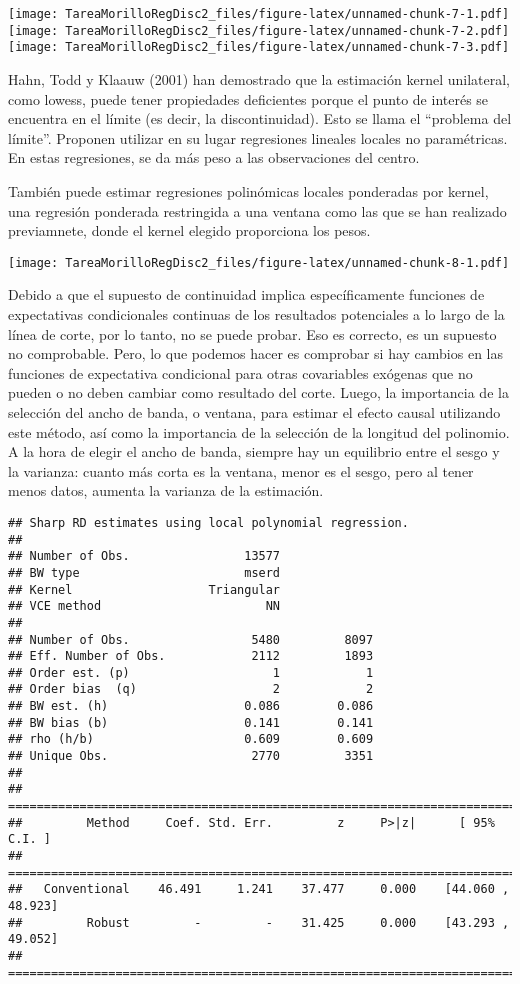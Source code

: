 \documentclass[
]{article}
\begin{document}
\texttt{[image: TareaMorilloRegDisc2\_files/figure-latex/unnamed-chunk-7-1.pdf]}
\texttt{[image: TareaMorilloRegDisc2\_files/figure-latex/unnamed-chunk-7-2.pdf]}
\texttt{[image: TareaMorilloRegDisc2\_files/figure-latex/unnamed-chunk-7-3.pdf]}

Hahn, Todd y Klaauw (2001) han demostrado que la estimación kernel
unilateral, como lowess, puede tener propiedades deficientes porque el
punto de interés se encuentra en el límite (es decir, la
discontinuidad). Esto se llama el ``problema del límite''. Proponen
utilizar en su lugar regresiones lineales locales no paramétricas. En
estas regresiones, se da más peso a las observaciones del centro.

También puede estimar regresiones polinómicas locales ponderadas por
kernel, una regresión ponderada restringida a una ventana como las que
se han realizado previamnete, donde el kernel elegido proporciona los
pesos.

\texttt{[image: TareaMorilloRegDisc2\_files/figure-latex/unnamed-chunk-8-1.pdf]}

Debido a que el supuesto de continuidad implica específicamente
funciones de expectativas condicionales continuas de los resultados
potenciales a lo largo de la línea de corte, por lo tanto, no se puede
probar. Eso es correcto, es un supuesto no comprobable. Pero, lo que
podemos hacer es comprobar si hay cambios en las funciones de
expectativa condicional para otras covariables exógenas que no pueden o
no deben cambiar como resultado del corte. Luego, la importancia de la
selección del ancho de banda, o ventana, para estimar el efecto causal
utilizando este método, así como la importancia de la selección de la
longitud del polinomio. A la hora de elegir el ancho de banda, siempre
hay un equilibrio entre el sesgo y la varianza: cuanto más corta es la
ventana, menor es el sesgo, pero al tener menos datos, aumenta la
varianza de la estimación.

\begin{verbatim}
## Sharp RD estimates using local polynomial regression.
## 
## Number of Obs.                13577
## BW type                       mserd
## Kernel                   Triangular
## VCE method                       NN
## 
## Number of Obs.                 5480         8097
## Eff. Number of Obs.            2112         1893
## Order est. (p)                    1            1
## Order bias  (q)                   2            2
## BW est. (h)                   0.086        0.086
## BW bias (b)                   0.141        0.141
## rho (h/b)                     0.609        0.609
## Unique Obs.                    2770         3351
## 
## =============================================================================
##         Method     Coef. Std. Err.         z     P>|z|      [ 95% C.I. ]       
## =============================================================================
##   Conventional    46.491     1.241    37.477     0.000    [44.060 , 48.923]    
##         Robust         -         -    31.425     0.000    [43.293 , 49.052]    
## =============================================================================
\end{verbatim}
\end{document}
